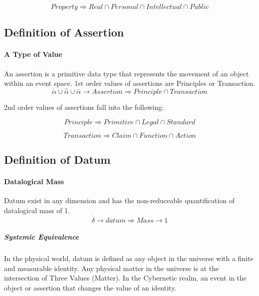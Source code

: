 \documentclass{article}
\begin{document}
			\begin{equation}
			Property \Rightarrow Real \cap Personal \cap Intellectual \cap Public
			\end{equation}

\subsection{Definition of Assertion}
	\paragraph{A Type  of Value}
		An assertion is a primitive data type that represents the movement of an object within an event space.
		1st order values of assertions are Principles or Transaction.
			\begin{equation}
				\dot \alpha \cup \hat \alpha \cup \bar \alpha \rightarrow Assertion \Rightarrow Principle \cap Transaction
			\end{equation}		


		2nd order values of assertions fall into the following:

			\begin{equation}
				Principle \Rightarrow Primitive \cap Legal \cap Standard
			\end{equation}
			
			\begin{equation}
				Transaction \Rightarrow Claim \cap Function \cap Action
			\end{equation}



\subsection{Definition of Datum}
	\paragraph{Datalogical Mass}
		Datum exist in any dimension and has the non-reduceable quantification of datalogical mass of 1.
			\begin{equation}
				\dot \delta \rightarrow datum \Rightarrow Mass \rightarrow 1
			\end{equation}
		\subparagraph{Systemic Equivalence}
			In the physical world, datum is defined as any object in the universe with a finite and measurable identity. Any physical matter in the universe is at the intersection of Three Values (Matter). In the Cybernetic realm, an event in the object or assertion that changes the value of an identity.
\end{document}
